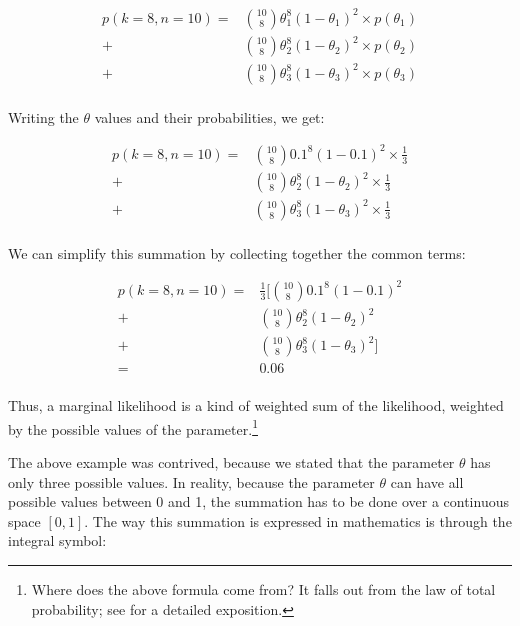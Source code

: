 \documentclass[12pt,]{krantz}
\theoremstyle{definition}
\theoremstyle{definition}
\theoremstyle{definition}
\theoremstyle{remark}
\begin{document}
\begin{equation}
\begin{split}
p(k=8,n=10) =& \binom{10}{8} \theta_1^8 (1-\theta_1)^{2} \times p(\theta_1) \\
            +& \binom{10}{8} \theta_2^8 (1-\theta_2)^{2}\times p(\theta_2) \\
            +& \binom{10}{8} \theta_3^8 (1-\theta_3)^{2}\times p(\theta_3)\\
\end{split}
\end{equation}

Writing the \(\theta\) values and their probabilities, we get:

\begin{equation}
\begin{split}
p(k=8,n=10) =& \binom{10}{8} 0.1^8 (1-0.1)^{2} \times \frac{1}{3} \\
            +& \binom{10}{8} \theta_2^8 (1-\theta_2)^{2}\times \frac{1}{3} \\
            +& \binom{10}{8} \theta_3^8 (1-\theta_3)^{2}\times \frac{1}{3}\\
\end{split}
\end{equation}

We can simplify this summation by collecting together the common terms:

\begin{equation}
\begin{split}
p(k=8,n=10) =& \frac{1}{3} [\binom{10}{8}  0.1^8 (1-0.1)^{2} \\
+& \binom{10}{8} \theta_2^8 (1-\theta_2)^{2} \\
+& \binom{10}{8} \theta_3^8 (1-\theta_3)^{2}] \\
=& 0.06 \\
\end{split}
\end{equation}

Thus, a marginal likelihood is a kind of weighted sum of the likelihood, weighted by the possible values of the parameter.\footnote{Where does the above formula come from? It falls out from the law of total probability; see \citet{blitzstein2014introduction} for a detailed exposition.}

The above example was contrived, because we stated that the parameter \(\theta\) has only three possible values. In reality, because the parameter \(\theta\) can have all possible values between 0 and 1, the summation has to be done over a continuous space \([0,1]\). The way this summation is expressed in mathematics is through the integral symbol:
\end{document}
